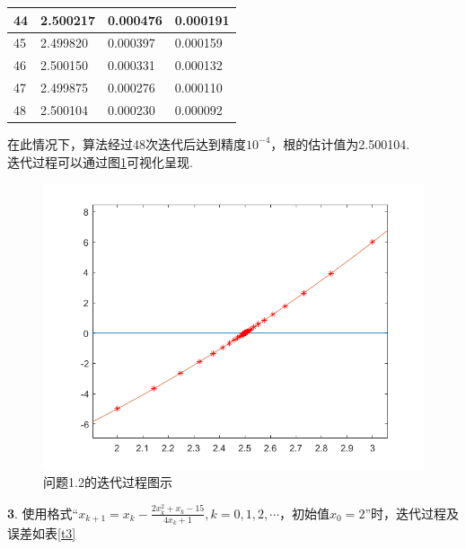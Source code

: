 \documentclass[UTF8]{ctexart}
\begin{document}
\begin{table}[]
\begin{tabular}{llll}
		44                                & 2.500217                           & 0.000476                        & 0.000191                          \\ \hline
		45                                & 2.499820                           & 0.000397                        & 0.000159                          \\ \hline
		46                                & 2.500150                           & 0.000331                        & 0.000132                          \\ \hline
		47                                & 2.499875                           & 0.000276                        & 0.000110                          \\ \hline
		48                                & 2.500104                           & 0.000230                        & 0.000092                          \\ \hline
	\end{tabular}
\end{table}
在此情况下，算法经过48次迭代后达到精度$10^{-4}$，根的估计值为2.500104.\\
迭代过程可以通过图\ref{fig:figure1}可视化呈现.\\
\begin{figure}[H]
	\begin{center}
		\includegraphics[width=0.7\columnwidth]{figures/problem2.png}
		\caption{问题1.2的迭代过程图示}
		\label{fig:figure1}
	\end{center}
\end{figure}
\textbf{3}. 使用格式“$x_{k+1}=x_{k}-\frac{2 x_{k}^{2}+x_{k}-15}{4 x_{k}+1}, k=0,1,2, \cdots$，初始值$x_{0}=2$”时，迭代过程及误差如表\ref{t3}
\end{document}
